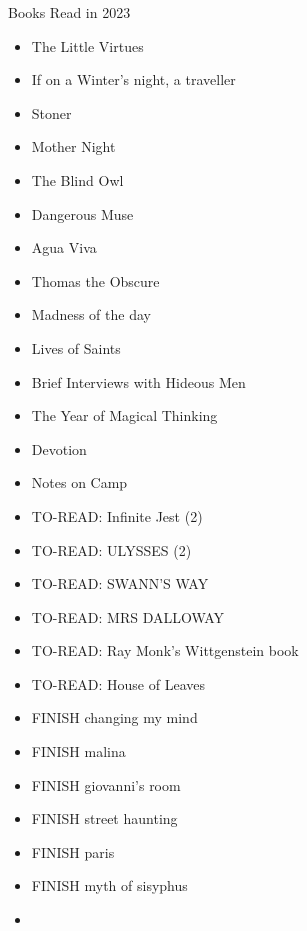 Books Read in 2023
\begin{itemize}
    \item The Little Virtues
    \item If on a Winter's night, a traveller
    \item Stoner
    \item Mother Night
    \item The Blind Owl
    \item Dangerous Muse
    \item Agua Viva
    \item Thomas the Obscure
    \item Madness of the day
    \item Lives of Saints
    \item Brief Interviews with Hideous Men
    \item The Year of Magical Thinking
    \item Devotion
    \item Notes on Camp
    \item TO-READ: Infinite Jest (2)
    \item TO-READ: ULYSSES (2)
    \item TO-READ: SWANN'S WAY
    \item TO-READ: MRS DALLOWAY
    \item TO-READ: Ray Monk's Wittgenstein book
    \item TO-READ: House of Leaves
    \item FINISH changing my mind
    \item FINISH malina
    \item FINISH giovanni's room
    \item FINISH street haunting
    \item FINISH paris
    \item FINISH myth of sisyphus
    \item 
\end{itemize}